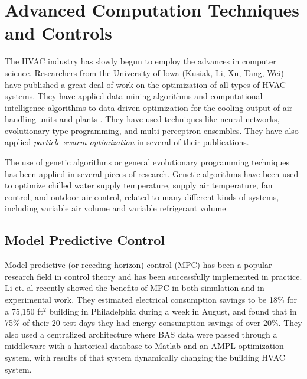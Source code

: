 \section{Advanced Computation Techniques and Controls}

The HVAC industry has slowly begun to employ the advances in computer
science. Researchers from the University of Iowa (Kusiak, Li, Xu, Tang,
Wei) have published a great deal of work on the optimization of all
types of HVAC systems. They have applied data mining algorithms and
computational intelligence algorithms to data-driven optimization for
the cooling output of air handling units and plants
\cite{Kusiak2014MinimizationOfEnergyConsumptionInHVAC, HeXiaofei2014,
Kusiak2013MinimizingEnergyConsumption,
Kusiak2012ModelingAndOptimizationOfHVAC, Kusiak2011MultiObjective,
Kusiak2010ReheatBox, WeiXiupeng2015,
WeiXiupeng2014ModelingAndOptimizationOfAChillerPlant, Kusiak2010,
Kusiak2010ModelingAndOptimization,
Kusiak2011OptimizationOfAnHVACSystemWithAStrength}. They have used
techniques like neural networks, evolutionary type programming, and
multi-perceptron ensembles. They have also applied
\textit{particle-swarm optimization} in several of their publications. 

The use of genetic algorithms or general evolutionary programming
techniques has been applied in several pieces of research. Genetic
algorithms have been used to optimize chilled water supply temperature,
supply air temperature, fan control, and outdoor air control, related to
many different kinds of systems, including variable air volume and
variable refrigerant volume
\cite{Fong2006HVACProgramming,Jin2005Prediction-basedSystems,Parameshwaran2010EnergyAlgorithm,Congradac2009HVACAlgorithms}

\subsection{Model Predictive Control}

Model predictive (or receding-horizon) control (MPC) has been a popular
research field in control theory and has been successfully implemented
in practice. Li et. al \cite{Li2015} recently showed the
benefits of MPC in both simulation and in experimental work. They
estimated electrical consumption savings to be 18\% for a 75,150
ft\(^2\) building in Philadelphia during a week in August, and found
that in 75\% of their 20 test days they had energy consumption savings
of over 20\%. They also used a centralized architecture where BAS data
were passed through a middleware with a historical database to Matlab and
an AMPL optimization system, with results of that system dynamically changing
the building HVAC system.

